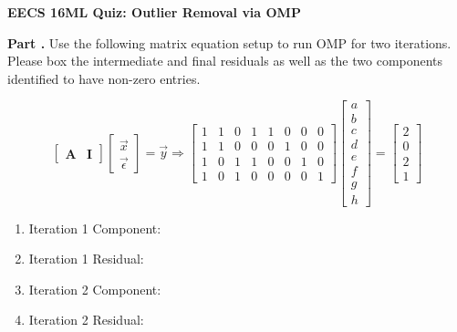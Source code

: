 \documentclass[11pt,letterpaper]{article}
\newcounter{problem}
\newcommand{\problem}{
	\stepcounter{problem}%
	\noindent \textbf{Part \theproblem. }%
}
\newcommand{\pspace}{\par\vspace{\baselineskip}}
\begin{document}
\textbf{EECS 16ML Quiz: Outlier Removal via OMP} \pspace


\problem Use the following matrix equation setup to run OMP for two iterations. Please box the intermediate and final residuals as well as the two components identified to have non-zero entries.

\begin{equation*}
    \begin{bmatrix}
        \boldsymbol{A} & \boldsymbol{I}
    \end{bmatrix}\begin{bmatrix}
        \vec{x} \\
        \vec{\epsilon}
    \end{bmatrix}
     = \vec{y} \Rightarrow
    \begin{bmatrix}
         1 & 1 & 0 & 1 & 1 & 0 & 0 & 0 \\
         1 & 1 & 0 & 0 & 0 & 1 & 0 & 0 \\
         1 & 0 & 1 & 1 & 0 & 0 & 1 & 0 \\
         1 & 0 & 1 & 0 & 0 & 0 & 0 & 1
    \end{bmatrix}
    \begin{bmatrix}
         a \\ b \\ c \\ d \\ e \\ f \\ g \\ h
    \end{bmatrix}
    =\begin{bmatrix}
         2 \\ 0 \\ 2 \\ 1
    \end{bmatrix}
\end{equation*}

\begin{enumerate}
    \item Iteration 1 Component: \vspace{3cm}
	\item Iteration 1 Residual: \vspace{3cm}
	\item Iteration 2 Component: \vspace{3cm}
	\item Iteration 2 Residual: \vspace{3cm}
\end{enumerate} 
\end{document}
